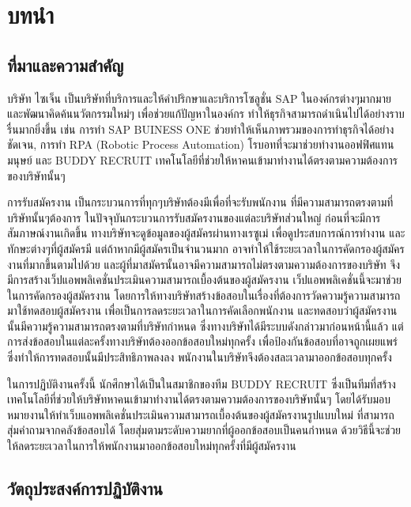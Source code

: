 \chapter{บทนำ}
\label{chapter:introduction}

\section{ที่มาและความสำคัญ}

บริษัท ไซเจ็น เป็นบริษัทที่บริการและให้คำปริกษาและบริการโซลูชั่น SAP ในองค์กรต่างๆมากมาย และพัฒนาคิดค้นนวัตกรรมใหม่ๆ เพื่อช่วยแก้ปัญหาในองค์กร ทำให้ธุรกิจสามารถดำเนินไปได้อย่างราบรื่นมากยิ่งขึ้น เช่น การทำ SAP BUINESS ONE ช่วยทำให้เห็นภาพรวมของการทำธุรกิจได้อย่างชัดเจน,  การทำ RPA (Robotic Process Automation) โรบอทที่จะมาช่วยทำงานออฟฟิศแทนมนุษย์ และ BUDDY RECRUIT เทคโนโลยีที่ช่วยให้หาคนเข้ามาทำงานได้ตรงตามความต้องการของบริษัทนั้นๆ

การรับสมัครงาน เป็นกระบวนการที่ทุกๆบริษัทต้องมีเพื่อที่จะรับพนักงาน ที่มีความสามารถตรงตามที่บริษัทนั้นๆต้องการ ในปัจจุบันกระบวนการรับสมัครงานของแต่ละบริษัทส่วนใหญ่ ก่อนที่จะมีการสัมภาษณ์งานเกิดขึ้น ทางบริษัทจะดูข้อมูลของผู้สมัครผ่านทางเรซูเม่ เพื่อดูประสบการณ์การทำงาน และทักษะต่างๆที่ผู้สมัครมี แต่ถ้าหากมีผู้สมัครเป็นจำนวนมาก อาจทำให้ใช้ระยะเวลาในการคัดกรองผู้สมัครงานที่มากขึ้นตามไปด้วย และผู้ที่มาสมัครนั้นอาจมีความสามารถไม่ตรงตามความต้องการของบริษัท จึงมีการสร้างเว็ปแอพพลิเคชั่นประเมินความสามารถเบื้องต้นของผู้สมัครงาน เว็ปแอพพลิเคชั่นนี้จะมาช่วยในการคัดกรองผู้สมัครงาน โดยการให้ทางบริษัทสร้างข้อสอบในเรื่องที่ต้องการวัดความรู้ความสามารถ มาใช้ทดสอบผู้สมัครงาน เพื่อเป็นการลดระยะเวลาในการคัดเลือกพนักงาน และทดสอบว่าผู้สมัครงานนั้นมีความรู้ความสามารถตรงตามที่บริษัทกำหนด ซึ่งทางบริษัทได้มีระบบดังกล่าวมาก่อนหน้านี้แล้ว แต่การส่งข้อสอบในแต่ละครั้งทางบริษัทต้องออกข้อสอบใหม่ทุกครั้ง เพื่อป้องกันข้อสอบที่อาจถูกเผยแพร่ซึ่งทําให้การทดสอบนั้นมีประสิทธิภาพลงลง  พนักงานในบริษัทจึงต้องสละเวลามาออกข้อสอบทุกครั้ง

ในการปฏิบัติงานครั้งนี้ นักศึกษาได้เป็นในสมาชิกของทีม BUDDY RECRUIT ซึ่งเป็นทีมที่สร้างเทคโนโลยีที่ช่วยให้บริษัทหาคนเข้ามาทำงานได้ตรงตามความต้องการของบริษัทนั้นๆ  โดยได้รับมอบหมายงานให้ทำเว็บแอพพลิเคชั่นประเมินความสามารถเบื้องต้นของผู้สมัครงานรูปแบบใหม่ ที่สามารถสุ่มคำถามจากคลังข้อสอบได้ โดยสุ่มตามระดับความยากที่ผู้ออกข้อสอบเป็นคนกำหนด ด้วยวิธีนี้จะช่วยให้ลดระยะเวลาในการให้พนักงานมาออกข้อสอบใหม่ทุกครั้งที่มีผู้สมัครงาน

\section{วัตถุประสงค์การปฏิบัติงาน}


